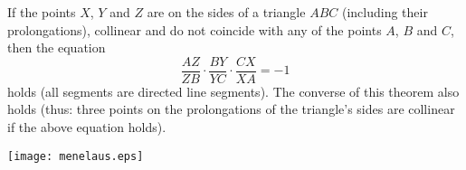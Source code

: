 \documentclass[12pt]{article}
\begin{document}
If the points $X$, $Y$ and $Z$ are on the sides of a triangle $ABC$ (including their prolongations), collinear and do not coincide with any of the points $A$, $B$ and $C$, then the equation
$$\frac{AZ}{ZB}\cdot\frac{BY}{YC}\cdot\frac{CX}{XA} = -1$$
holds (all segments are directed line segments). The converse of this theorem also holds (thus: three points on the prolongations of the triangle's sides are collinear if the above equation holds).
\begin{center}
\texttt{[image: menelaus.eps]}
\end{center}
\end{document}
